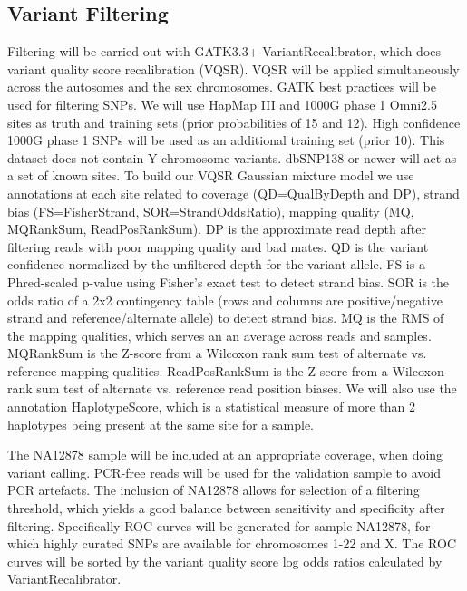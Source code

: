 \subsection{Variant Filtering}


Filtering will be carried out with GATK3.3+ VariantRecalibrator, which does variant quality score recalibration (VQSR). VQSR will be applied simultaneously across the autosomes and the sex chromosomes. GATK best practices will be used for filtering SNPs.
We will use HapMap III and 1000G phase 1 Omni2.5 sites as truth and training sets (prior probabilities of 15 and 12). High confidence 1000G phase 1 SNPs will be used as an additional training set (prior 10). This dataset does not contain Y chromosome variants. %
dbSNP138 or newer will act as a set of known sites.
To build our VQSR Gaussian mixture model we use annotations at each site related to coverage (QD=QualByDepth and DP), strand bias (FS=FisherStrand, SOR=StrandOddsRatio), mapping quality (MQ, MQRankSum, ReadPosRankSum).
DP is the approximate read depth after filtering reads with poor mapping quality and bad mates. QD is the variant confidence normalized by the unfiltered depth for the variant allele. FS is a Phred-scaled p-value using Fisher's exact test to detect strand bias. SOR is the odds ratio of a 2x2 contingency table (rows and columns are positive/negative strand and reference/alternate allele) to detect strand bias. MQ is the RMS of the mapping qualities, which serves an an average across reads and samples. MQRankSum is the Z-score from a Wilcoxon rank sum test of alternate vs. reference mapping qualities. ReadPosRankSum is the Z-score from a Wilcoxon rank sum test of alternate vs. reference read position biases.
We will also use the annotation HaplotypeScore, which is a statistical measure of more than 2 haplotypes being present at the same site for a sample.

The NA12878 sample will be included at an appropriate coverage, when doing variant calling. PCR-free reads will be used for the validation sample to avoid PCR artefacts. The inclusion of NA12878 allows for selection of a filtering threshold, which yields a good balance between sensitivity and specificity after filtering. Specifically ROC curves will be generated for sample NA12878, for which highly curated SNPs
are available for chromosomes 1-22 and X. The ROC curves will be sorted by the variant quality score log odds ratios calculated by VariantRecalibrator.

